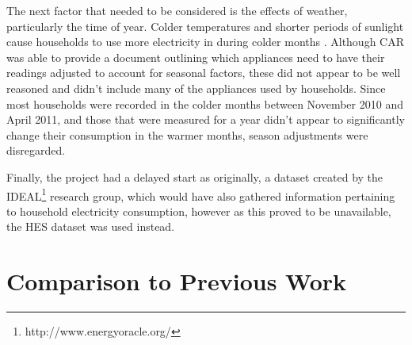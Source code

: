 The next factor that needed to be considered is the effects of weather, particularly the time of year. Colder temperatures and shorter periods of sunlight cause households to use more electricity in during colder months \cite{DECC}. Although CAR was able to provide a document outlining which appliances need to have their readings adjusted to account for seasonal factors, these did not appear to be well reasoned and didn't include many of the appliances used by households. Since most households were recorded in the colder months between November 2010 and April 2011, and those that were measured for a year didn't appear to significantly change their consumption in the warmer months, season adjustments were disregarded.

Finally, the project had a delayed start as originally, a dataset created by the IDEAL\footnote{http://www.energyoracle.org/} research group, which would have also gathered information pertaining to household electricity consumption, however as this proved to be unavailable, the HES dataset was used instead.





\section{Comparison to Previous Work}
\label{sec:previousWork}


